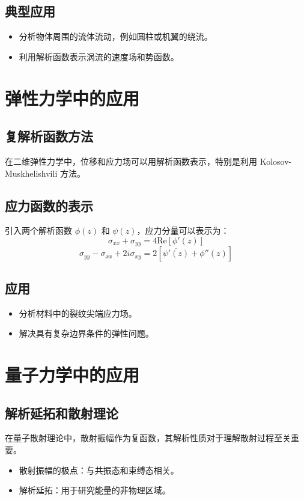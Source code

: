 \documentclass[12pt]{article}
\begin{document}
	\subsection{典型应用}
	\begin{itemize}
		\item 分析物体周围的流体流动，例如圆柱或机翼的绕流。
		\item 利用解析函数表示涡流的速度场和势函数。
	\end{itemize}
	
	\section{弹性力学中的应用}
	
	\subsection{复解析函数方法}
	在二维弹性力学中，位移和应力场可以用解析函数表示，特别是利用 Kolosov-Muskhelishvili 方法。
	
	\subsection{应力函数的表示}
	引入两个解析函数 $\phi(z)$ 和 $\psi(z)$，应力分量可以表示为：
	\[
	\sigma_{xx} + \sigma_{yy} = 4\mathrm{Re}[\phi'(z)]
	\]
	\[
	\sigma_{yy} - \sigma_{xx} + 2i\sigma_{xy} = 2[\overline{\psi'(z)} + \phi''(z)]
	\]
	
	\subsection{应用}
	\begin{itemize}
		\item 分析材料中的裂纹尖端应力场。
		\item 解决具有复杂边界条件的弹性问题。
	\end{itemize}
	
	\section{量子力学中的应用}
	
	\subsection{解析延拓和散射理论}
	在量子散射理论中，散射振幅作为复函数，其解析性质对于理解散射过程至关重要。
	\begin{itemize}
		\item 散射振幅的极点：与共振态和束缚态相关。
		\item 解析延拓：用于研究能量的非物理区域。
	\end{itemize}
	
\end{document}
